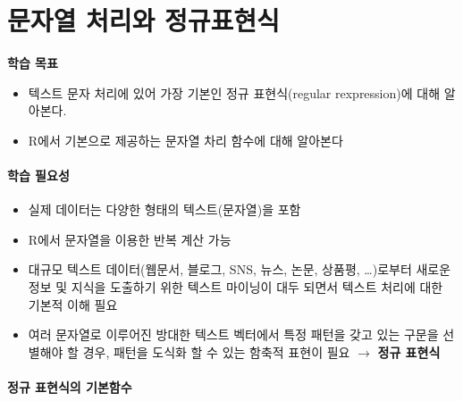 \documentclass[
  11pt,
]{krantz}
\makeatletter
\providecommand{\tightlist}{%
  \setlength{\itemsep}{0pt}\setlength{\parskip}{0pt}}
\newenvironment{kframe}{%
\medskip{}
\setlength{\fboxsep}{.8em}
 \def\at@end@of@kframe{}%
 \ifinner\ifhmode%
  \def\at@end@of@kframe{\end{minipage}}%
  \begin{minipage}{\columnwidth}%
 \fi\fi%
 \def\FrameCommand##1{\hskip\@totalleftmargin \hskip-\fboxsep
 \colorbox{shadecolor}{##1}\hskip-\fboxsep
     \hskip-\linewidth \hskip-\@totalleftmargin \hskip\columnwidth}%
 \MakeFramed {\advance\hsize-\width
   \@totalleftmargin\z@ \linewidth\hsize
   \@setminipage}}%
 {\par\unskip\endMakeFramed%
 \at@end@of@kframe}
\newenvironment{rmdblock}[1]
  {
  \begin{itemize}
  \renewcommand{\labelitemi}{
    \raisebox{-.7\height}[0pt][0pt]{
      {\setkeys{Gin}{width=3em,keepaspectratio}\texttt{[image: images/\#1]}}
    }
  }
  \setlength{\fboxsep}{1em}
  \begin{kframe}
  \item
  }
  {
  \end{kframe}
  \end{itemize}
  }
\newenvironment{rmdimportant}
  {\begin{rmdblock}{important}}
  {\end{rmdblock}}
\makeatother
\begin{document}
\hypertarget{string-regexp}{%
\chapter{문자열 처리와 정규표현식}\label{string-regexp}}

\footnotesize

\begin{rmdimportant}
\begin{rmdimportant}

\textbf{학습 목표}

\begin{itemize}
\tightlist
\item
  텍스트 문자 처리에 있어 가장 기본인 정규 표현식(regular rexpression)에 대해 알아본다.
\item
  R에서 기본으로 제공하는 문자열 차리 함수에 대해 알아본다
\end{itemize}

\end{rmdimportant}
\end{rmdimportant}

\normalsize

\hypertarget{ch03-require}{%
\subsubsection*{\texorpdfstring{\textbf{학습 필요성}}{학습 필요성}}\label{ch03-require}}


\begin{itemize}
\item
  실제 데이터는 다양한 형태의 텍스트(문자열)을 포함
\item
  R에서 문자열을 이용한 반복 계산 가능
\item
  대규모 텍스트 데이터(웹문서, 블로그, SNS, 뉴스, 논문, 상품평, \ldots)로부터 새로운 정보 및 지식을 도출하기 위한 텍스트 마이닝이 대두 되면서 텍스트 처리에 대한 기본적 이해 필요
\item
  여러 문자열로 이루어진 방대한 텍스트 벡터에서 특정 패턴을 갖고 있는 구문을 선별해야 할 경우, 패턴을 도식화 할 수 있는 함축적 표현이 필요 \(\rightarrow\) \textbf{정규 표현식}
\end{itemize}

\hypertarget{regex-prim-fun}{%
\subsubsection*{\texorpdfstring{\textbf{정규 표현식의 기본함수}}{정규 표현식의 기본함수}}\label{regex-prim-fun}}
\end{document}
